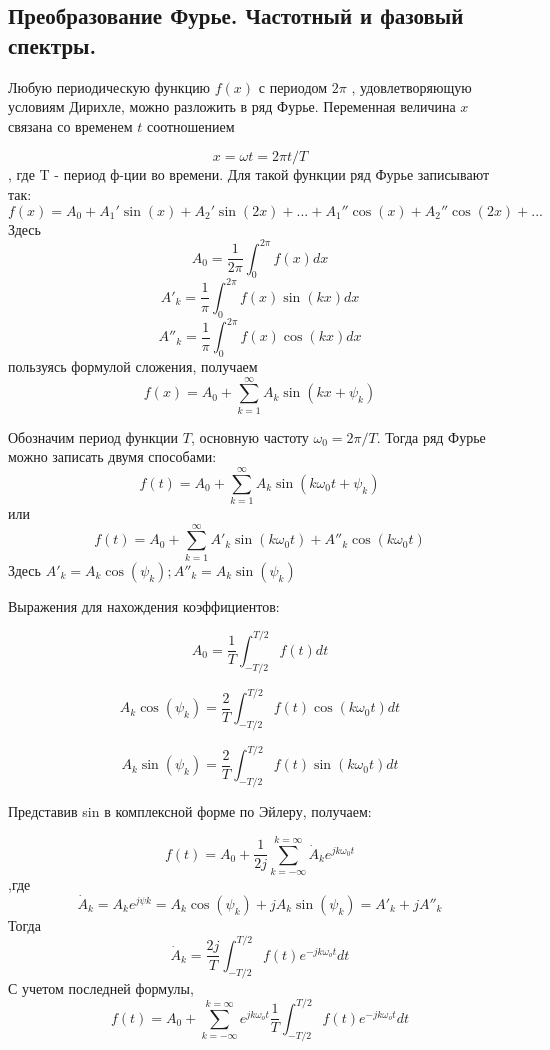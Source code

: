 \subsection{Преобразование Фурье. Частотный и фазовый спектры.}

Любую периодическую функцию $f(x)$ с периодом $2\pi$ , удовлетворяющую условиям Дирихле, можно разложить в ряд Фурье. Переменная величина $x$ связана со временем $t$ соотношением

$$
x = \omega t = 2\pi t /T
$$, где T - период ф-ции во времени.
Для такой функции ряд Фурье записывают так:
$$
f(x) = A_0 + A_{1}'\sin(x) + A_{2}'\sin(2x)+ ... + A_{1}''\cos(x) + A_{2}''\cos(2x) + ...
$$
Здесь
$$
A_0 = \frac{1}{2\pi}\int_0^{2\pi}f(x)dx
$$
$$
A'_k = \frac{1}{\pi}\int_0^{2\pi}f(x)\sin(kx)dx
$$
$$
A''_k = \frac{1}{\pi}\int_0^{2\pi}f(x)\cos(kx)dx
$$
пользуясь формулой сложения, получаем 
\begin{equation}
f(x) = A_0 + \sum_{k=1}^{\infty} A_k \sin(kx + \psi_k)
\end{equation}

Обозначим период функции $T$, основную частоту $\omega_0 = 2\pi/T$. Тогда ряд Фурье можно записать двумя способами:
$$
f(t) = A_0 + \sum_{k=1}^{\infty} A_k \sin(k\omega_0 t + \psi_k)
$$
или
$$
f(t) = A_0 + \sum_{k=1}^{\infty} A'_k \sin(k\omega_0 t) + A''_k\cos(k\omega_0 t)
$$
Здесь $A'_k = A_k\cos(\psi_k) ; A''_k = A_k\sin(\psi_k)$

Выражения для нахождения коэффициентов:

$$
A_0 = \frac{1}{T}\int_{-T/2}^{T/2} f(t) dt
$$

$$
A_k \cos(\psi_k) = \frac{2}{T} \int_{-T/2}^{T/2}f(t)\cos(k \omega_0 t) dt
$$

$$
A_k \sin(\psi_k) = \frac{2}{T} \int_{-T/2}^{T/2}f(t)\sin(k \omega_0 t) dt
$$

Представив sin в комплексной форме по Эйлеру, получаем:


\begin{equation}
f(t) = A_0 + \frac{1}{2j} \sum_{k = - \infty}^{k = \infty} \dot A_k e^{j k \omega_0 t} 
\end{equation}
,где
\begin{equation}
\dot A_{k} = A_k e^{j \psi k} = A_k \cos(\psi_k) + j A_k \sin(\psi_k) = A'_k + jA''_k
\end{equation}
Тогда 
\begin{equation}
\dot A_k = \frac{2j}{T} \int_{-T/2}^{T/2}f(t) e^{-j k \omega_o t} dt
\end{equation}
С учетом последней формулы,
\begin{equation}
f(t) = A_0 + \sum_{k = - \infty}^{k = \infty} e^{j k \omega_o t} \frac{1}{T} \int_{-T/2}^{T/2}f(t) e^{-j k \omega_o t} dt
\end{equation}

